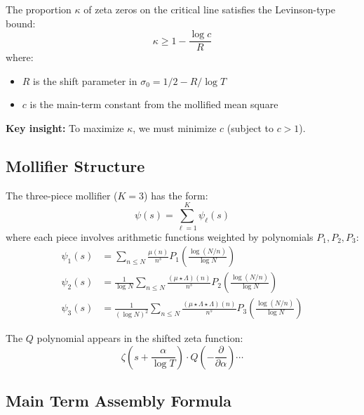 \documentclass[11pt]{article}
\begin{document}
The proportion $\kappa$ of zeta zeros on the critical line satisfies the Levinson-type bound:
\begin{equation}
\boxed{\kappa \geq 1 - \frac{\log c}{R}}
\end{equation}
where:
\begin{itemize}
\item $R$ is the shift parameter in $\sigma_0 = 1/2 - R/\log T$
\item $c$ is the main-term constant from the mollified mean square
\end{itemize}

\textbf{Key insight:} To maximize $\kappa$, we must minimize $c$ (subject to $c > 1$).

\subsection{Mollifier Structure}

The three-piece mollifier ($K=3$) has the form:
\begin{equation}
\psi(s) = \sum_{\ell=1}^{K} \psi_\ell(s)
\end{equation}
where each piece involves arithmetic functions weighted by polynomials $P_1, P_2, P_3$:
\begin{align}
\psi_1(s) &= \sum_{n \leq N} \frac{\mu(n)}{n^s} P_1\left(\frac{\log(N/n)}{\log N}\right) \\
\psi_2(s) &= \frac{1}{\log N} \sum_{n \leq N} \frac{(\mu \star \Lambda)(n)}{n^s} P_2\left(\frac{\log(N/n)}{\log N}\right) \\
\psi_3(s) &= \frac{1}{(\log N)^2} \sum_{n \leq N} \frac{(\mu \star \Lambda \star \Lambda)(n)}{n^s} P_3\left(\frac{\log(N/n)}{\log N}\right)
\end{align}

The $Q$ polynomial appears in the shifted zeta function:
\begin{equation}
\zeta\left(s + \frac{\alpha}{\log T}\right) \cdot Q\left(-\frac{\partial}{\partial \alpha}\right) \cdots
\end{equation}

\subsection{Main Term Assembly Formula}
\end{document}

